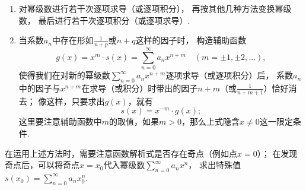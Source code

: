 \begin{enumerate}
\begin{enumerate}
	\item 对幂级数进行若干次逐项求导（或逐项积分），%
	再按其他几种方法变换幂级数，%
	最后进行若干次逐项积分（或逐项求导）.

	\item 当系数\(a_n\)中存在形如\(\frac{1}{n+p}\)或\(n+q\)这样的因子时，%
	构造辅助函数\[
		g(x) = x^m \cdot s(x) = \sum\limits_{n=0}^\infty a_n x^{n+m}
		\quad(m=\pm1,\pm2,\dotsc),
	\]
	使得我们在对新的幂级数\(\sum\limits_{n=0}^\infty a_n x^{n+m}\)逐项求导（或逐项积分）后，%
	系数\(a_n\)中的因子与\(x^{n+m}\)在求导（或积分）时带出的因子\(n+m\)（或\(\frac{1}{n+m+1}\)）恰好消去；
	像这样，只要求出\(g(x)\)，就有\[
		s(x) = x^{-m} \cdot g(x);
	\]
	这里要注意辅助函数中\(m\)的取值，如果\(m>0\)，那么上式隐含\(x\neq0\)这一限定条件.
\end{enumerate}
在运用上述方法时，需要注意函数解析式是否存在奇点（例如点\(x=0\)）；
在发现奇点后，可以将奇点\(x=x_0\)代入幂级数\(\sum\limits_{n=0}^\infty a_n x^n\)，%
求出特殊值\(s(x_0) = \sum\limits_{n=0}^\infty a_n x_0^n\).
\end{enumerate}


